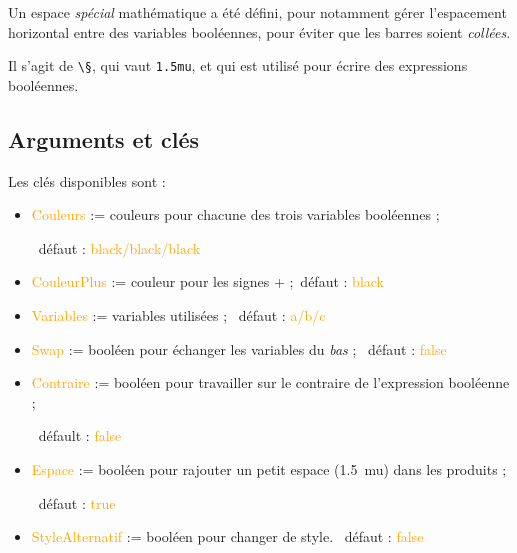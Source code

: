 \documentclass[french,a4paper,11pt]{article}
\newcommand\Cle[1]{{\small\sffamily\textlangle \textcolor{orange}{#1}\textrangle}}
\begin{document}
{{\begin{importantblock}
\begin{center}
	\begin{TableKarnaugh}
	\end{TableKarnaugh}
\end{center}
\end{importantblock}

\begin{tipblock}
Un espace \textit{spécial} mathématique a été défini, pour notamment gérer l'espacement horizontal entre des variables booléennes, pour éviter que les barres soient \textit{collées}.

Il s'agit de \texttt{\textbackslash §}, qui vaut \texttt{1.5mu}, et qui est utilisé pour écrire des expressions booléennes.
\end{tipblock}

\pagebreak

\subsection{Arguments et clés }

\begin{DemoCode}
\end{DemoCode}

\begin{tipblock}
Les clés disponibles sont :

\begin{itemize}
	\item \Cle{Couleurs} := couleurs pour chacune des trois variables booléennes ;
	
	\hfill~défaut : \Cle{black/black/black}
	\item \Cle{CouleurPlus} := couleur pour les signes + ;\hfill~défaut : \Cle{black}
	\item \Cle{Variables} := variables utilisées ; \hfill~défaut : \Cle{a/b/c}
	\item \Cle{Swap} := booléen pour échanger les variables du \textit{bas} ; \hfill~défaut : \Cle{false}
	\item \Cle{Contraire} := booléen pour travailler sur le contraire de l'expression booléenne ;
	
	\hfill~défault : \Cle{false}
	\item \Cle{Espace} := booléen pour rajouter un petit espace (1.5~mu) dans les produits ;
	
	\hfill~défaut : \Cle{true}
	\item \Cle{StyleAlternatif} := booléen pour changer de style. \hfill~défaut : \Cle{false}
\end{itemize}


\end{tipblock}}}
\end{document}
